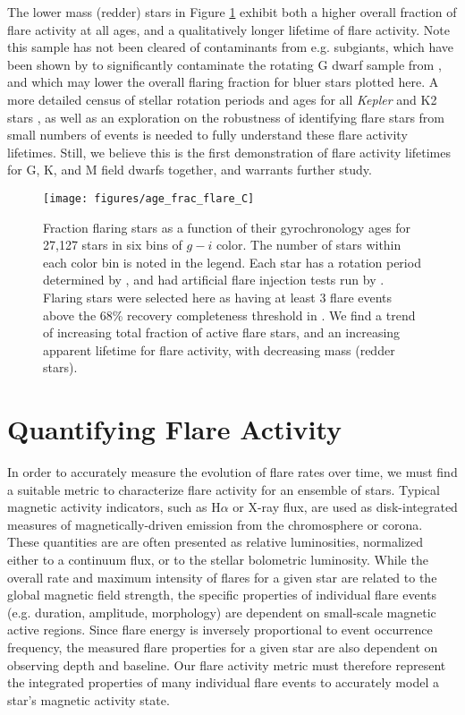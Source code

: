 \documentclass[preprint2]{aastex62}
\newcommand{\Kepler}{\textsl{Kepler}\xspace}
\begin{document}
The lower mass (redder) stars in Figure \ref{fig:fracactive} exhibit both a higher overall fraction of flare activity at all ages, and a qualitatively longer lifetime of flare activity. Note this sample has not been cleared of contaminants from e.g. subgiants, which have been shown by \citet{davenport2017} to significantly contaminate the rotating G dwarf sample from \citet{mcquillan2014}, and which may lower the overall flaring fraction for bluer stars plotted here.  A more detailed census of stellar rotation periods and ages for all \Kepler and K2 stars \citep[e.g. see][]{van-saders2018}, as well as an exploration on the robustness of identifying flare stars from small numbers of events is needed to fully understand these flare activity lifetimes.
Still, we believe this is the first demonstration of flare activity lifetimes for G, K, and M field dwarfs together, and warrants further study.


\begin{figure}[!t]
\centering
\texttt{[image: figures/age\_frac\_flare\_C]}
\caption{
Fraction flaring stars as a function of their gyrochronology ages for 27,127 stars in six bins of $g-i$ color. The number of stars within each color bin is noted in the legend.
Each star has a rotation period determined by \citet{mcquillan2014}, and had artificial flare injection tests run by \citet{davenport2016}. Flaring stars were selected here as having at least 3 flare events above the 68\% recovery completeness threshold in \citet{davenport2016}. We find a trend of increasing total fraction of active flare stars, and an increasing apparent lifetime for flare activity, with decreasing mass (redder stars).
}
\label{fig:fracactive}
\end{figure}





\section{Quantifying Flare Activity}
\label{sec:activity}

In order to accurately measure the evolution of flare rates over time, we must find a suitable metric to characterize flare activity for an ensemble of stars. Typical magnetic activity indicators, such as H$\alpha$ or X-ray flux, are used as disk-integrated measures of magnetically-driven emission from the chromosphere or corona. These quantities are are often presented as relative luminosities, normalized either to a continuum flux, or to the stellar bolometric luminosity.  While the overall rate and maximum intensity of flares for a given star are related to the global magnetic field strength, the specific properties of individual flare events  (e.g. duration, amplitude, morphology) are dependent on small-scale magnetic active regions. Since flare energy is inversely proportional to event occurrence frequency, the measured flare properties for a given star are also dependent on observing depth and baseline. Our flare activity metric must therefore represent the integrated properties of many individual flare events to accurately model a star's magnetic activity state.
\end{document}
